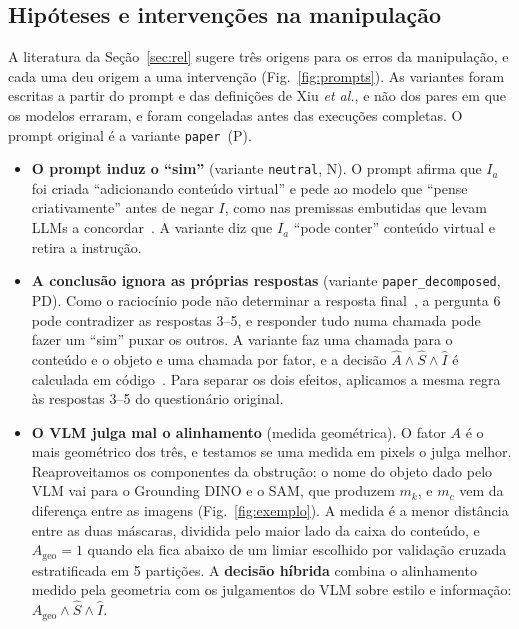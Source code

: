 \documentclass[conference]{IEEEtran}
\newcommand{\Ia}{I_a}
\newcommand{\Ageo}{A_{\mathrm{geo}}}
\newcommand{\var}[1]{\texttt{#1}}
\newcommand{\vpaper}{\var{paper}}
\newcommand{\vneutral}{\var{neutral}}
\newcommand{\vpd}{\var{paper\_\allowbreak decomposed}}
\begin{document}
\subsection{Hipóteses e intervenções na manipulação}
\label{sec:hipoteses}
A literatura da Seção~\ref{sec:rel} sugere três origens para os erros da manipulação, e cada uma deu
origem a uma intervenção (Fig.~\ref{fig:prompts}). As variantes foram escritas a partir do prompt e das
definições de Xiu \emph{et al.}, e não dos pares em que os modelos erraram, e foram congeladas antes das
execuções completas. O prompt original é a variante \vpaper\ (P).
\begin{itemize}
\item \textbf{O prompt induz o ``sim''} (variante \vneutral, N). O prompt afirma que $\Ia$ foi criada
  ``adicionando conteúdo virtual'' e pede ao modelo que ``pense criativamente'' antes de negar $I$, como
  nas premissas embutidas que levam LLMs a concordar~\cite{sharma2024,pope}. A variante diz que $\Ia$
  ``pode conter'' conteúdo virtual e retira a instrução.
\item \textbf{A conclusão ignora as próprias respostas} (variante \vpd, PD). Como o raciocínio pode não
  determinar a resposta final~\cite{turpin2023}, a pergunta 6 pode contradizer as respostas 3--5, e
  responder tudo numa chamada pode fazer um ``sim'' puxar os outros. A variante faz uma chamada para o
  conteúdo e o objeto e uma chamada por fator, e a decisão $\hat A\wedge\hat S\wedge\hat I$ é calculada
  em código~\cite{khot2023}. Para separar os dois efeitos, aplicamos a mesma regra às respostas 3--5 do
  questionário original.
\item \textbf{O VLM julga mal o alinhamento} (medida geométrica). O fator $A$ é o mais geométrico dos
  três, e testamos se uma medida em pixels o julga melhor. Reaproveitamos os componentes da obstrução: o
  nome do objeto dado pelo VLM vai para o Grounding DINO e o SAM, que produzem $m_k$, e $m_c$ vem da
  diferença entre as imagens (Fig.~\ref{fig:exemplo}). A medida é a menor distância entre as duas
  máscaras, dividida pelo maior lado da caixa do conteúdo, e $\Ageo=1$ quando ela fica abaixo de um
  limiar escolhido por validação cruzada estratificada em 5 partições. A \textbf{decisão híbrida} combina
  o alinhamento medido pela geometria com os julgamentos do VLM sobre estilo e informação:
  $\Ageo\wedge\hat S\wedge\hat I$.
\end{itemize}
\end{document}
